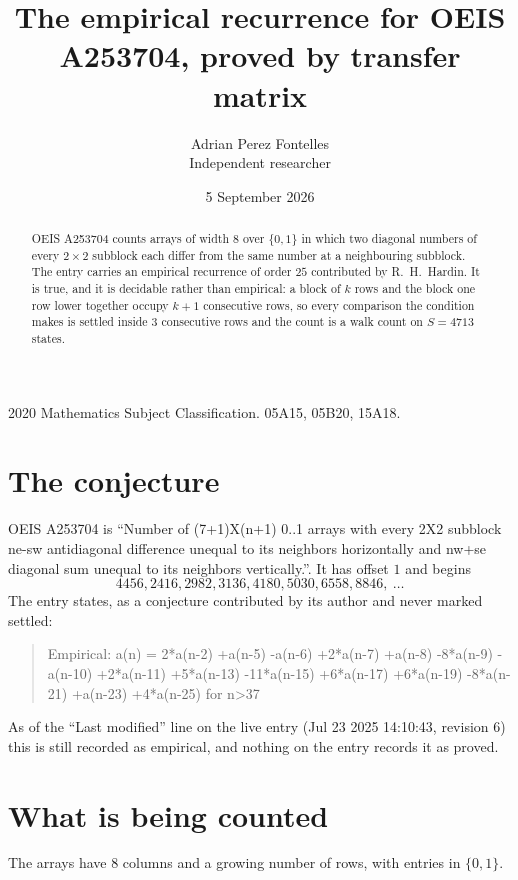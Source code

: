 \documentclass[11pt,a4paper]{article}
\title{The empirical recurrence for OEIS A253704, proved by transfer matrix}
\author{Adrian Perez Fontelles\\ \small Independent researcher}
\date{5 September 2026}
\theoremstyle{plain}
\theoremstyle{definition}
\begin{document}
\maketitle

\begin{abstract}
OEIS A253704 counts arrays of width $8$ over $\{0,1\}$ in which two diagonal numbers of every $2\times2$ subblock each differ from the same number at a neighbouring subblock. The entry carries an
empirical recurrence of order $25$ contributed by R.~H.~Hardin. It is true, and it is
decidable rather than empirical: a block of $k$ rows and the block one row lower together
occupy $k+1$ consecutive rows, so every comparison the condition makes is settled inside
$3$ consecutive rows and the count is a walk count on $S=4713$ states.
\end{abstract}

\noindent\small 2020 Mathematics Subject Classification. 05A15, 05B20, 15A18.\normalsize

\section{The conjecture}

OEIS A253704 is ``Number of (7+1)X(n+1) 0..1 arrays with every 2X2 subblock ne-sw antidiagonal difference unequal to its neighbors horizontally and nw+se diagonal sum unequal to its neighbors vertically.''. It has offset $1$ and begins
\[
4456, 2416, 2982, 3136, 4180, 5030, 6558, 8846,\ \dots
\]
The entry states, as a conjecture contributed by its author and never marked settled:
\begin{quote}
Empirical: a(n) = 2*a(n-2) +a(n-5) -a(n-6) +2*a(n-7) +a(n-8) -8*a(n-9) -a(n-10) +2*a(n-11) +5*a(n-13) -11*a(n-15) +6*a(n-17) +6*a(n-19) -8*a(n-21) +a(n-23) +4*a(n-25) for n>37
\end{quote}
As of the ``Last modified'' line on the live entry (Jul 23 2025 14:10:43, revision 6) this is still
recorded as empirical, and nothing on the entry records it as proved.

\section{What is being counted}

The arrays have $8$ columns and a growing number of rows, with entries in $\{0,1\}$.
\end{document}
